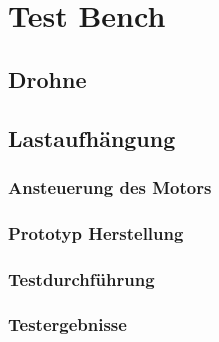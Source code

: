 \chapter{Test Bench}

\section{Drohne}

\section{Lastaufhängung}
\subsection{Ansteuerung des Motors}
\subsection{Prototyp Herstellung}
\subsection{Testdurchführung}
\subsection{Testergebnisse}
